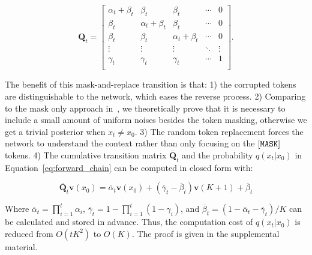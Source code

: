 \begin{equation}

   \bm{Q}_t =
   \begin{bmatrix}
   \alpha_t + \beta_t & \beta_t & \beta_t & \cdots & 0 \\
   \beta_t & \alpha_t + \beta_t & \beta_t & \cdots & 0 \\
   \beta_t & \beta_t & \alpha_t + \beta_t & \cdots & 0 \\
   \vdots & \vdots & \vdots & \ddots & \vdots \\
   \gamma_t & \gamma_t &\gamma_t  & \cdots & 1 \\
   \end{bmatrix}.

\label{eq:mask_transit}
\end{equation}

The benefit of this mask-and-replace transition is that: 1) the corrupted tokens are distinguishable to the network, which eases the reverse process. 2) Comparing to the mask only approach in~\cite{austin2021structured}, we theoretically prove that it is necessary to include a small amount of uniform noises besides the token masking, otherwise we get a trivial posterior when $x_t \neq x_0$. 3) The random token replacement forces the network to understand the context rather than only focusing on the $[\text{\tt{MASK}}]$ tokens. 4) The cumulative transition matrix $\overline{\bm{Q}}_t$ and the probability $q(x_t|x_0)$ in Equation~\ref{eq:forward_chain} can be computed in closed form with:

\begin{equation}
	\overline{\bm{Q}}_t \bm{v}(x_0)=\overline{\alpha}_t \bm{v}(x_0) + (\overline{\gamma}_t - \overline{\beta}_t)\bm{v}(K+1) + \overline{\beta}_t
	\label{eqn:fast_Qtv}
\end{equation}

Where $\overline{\alpha}_t=\prod_{i=1}^t\alpha_i$, $\overline{\gamma}_t=1-\prod_{i=1}^t(1-\gamma_i)$, and $\overline{\beta}_t = (1-\overline{\alpha}_t-\overline{\gamma}_t)/K$ can be calculated and stored in advance. Thus, the computation cost of $q(x_t|x_0)$ is reduced from $O(tK^2)$ to $O(K)$. The proof is given in the supplemental material.


